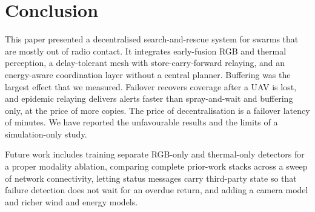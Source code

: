 \documentclass[10pt,a4paper,twocolumn]{article}
\begin{document}
\section{Conclusion}\label{sec:concl}
This paper presented a decentralised search-and-rescue system for swarms that are mostly out of radio contact. It integrates early-fusion RGB and thermal perception, a delay-tolerant mesh with store-carry-forward relaying, and an energy-aware coordination layer without a central planner. Buffering was the largest effect that we measured. Failover recovers coverage after a UAV is lost, and epidemic relaying delivers alerts faster than spray-and-wait and buffering only, at the price of more copies. The price of decentralisation is a failover latency of minutes. We have reported the unfavourable results and the limits of a simulation-only study.

Future work includes training separate RGB-only and thermal-only detectors for a proper modality ablation, comparing complete prior-work stacks across a sweep of network connectivity, letting status messages carry third-party state so that failure detection does not wait for an overdue return, and adding a camera model and richer wind and energy models.

\end{document}
